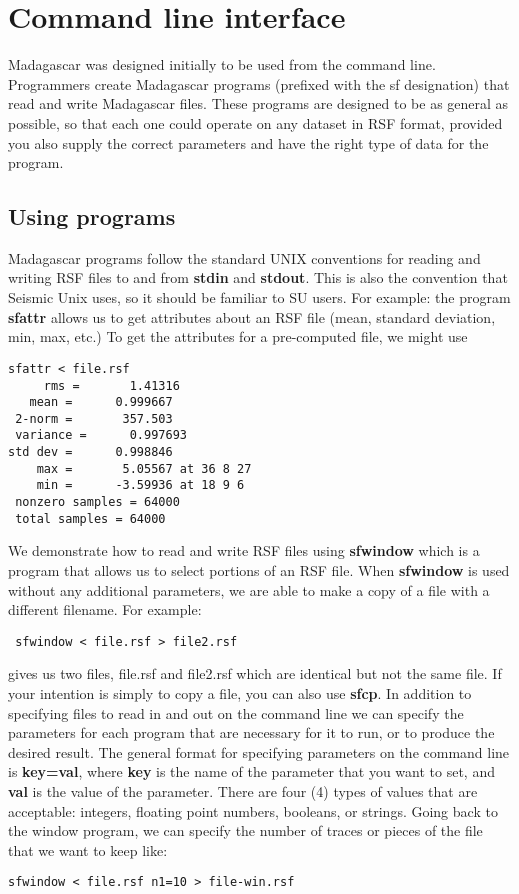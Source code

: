 \section{Command line interface}
Madagascar was designed initially to be used from the command
line. Programmers create Madagascar programs (prefixed with the sf
designation) that read and write Madagascar files. These programs are
designed to be as general as possible, so that each one could operate
on any dataset in RSF format, provided you also supply the correct
parameters and have the right type of data for the program.

\subsection{Using programs}
Madagascar programs follow the standard UNIX conventions for reading and writing RSF files to and from \textbf{stdin} and \textbf{stdout}. This is also the convention that Seismic Unix uses, so it should be familiar to SU users.
For example: the program \textbf{sfattr} allows us to get attributes about an RSF file (mean, standard deviation, min, max, etc.) To get the attributes for a pre-computed file, we might use
\begin{verbatim}
sfattr < file.rsf
     rms =       1.41316 
   mean =      0.999667 
 2-norm =       357.503 
 variance =      0.997693 
std dev =      0.998846 
    max =       5.05567 at 36 8 27 
    min =      -3.59936 at 18 9 6 
 nonzero samples = 64000 
 total samples = 64000 
 \end{verbatim}
We demonstrate how to read and write RSF files using \textbf{sfwindow} which is a program that allows us to select portions of an RSF file. When \textbf{sfwindow} is used without any additional parameters, we are able to make a copy of a file with a different filename. For example:
\begin{verbatim}
 sfwindow < file.rsf > file2.rsf
 \end{verbatim}
gives us two files, file.rsf and file2.rsf which are identical but not the same file. If your intention is simply to copy a file, you can also use \textbf{sfcp}.
In addition to specifying files to read in and out on the command line we can specify the parameters for each program that are necessary for it to run, or to produce the desired result. The general format for specifying parameters on the command line is \textbf{key=val}, where \textbf{key} is the name of the parameter that you want to set, and \textbf{val} is the value of the parameter. There are four (4) types of values that are acceptable: integers, floating point numbers, booleans, or strings. Going back to the window program, we can specify the number of traces or pieces of the file that we want to keep like:
\begin{verbatim}
sfwindow < file.rsf n1=10 > file-win.rsf
\end{verbatim}

